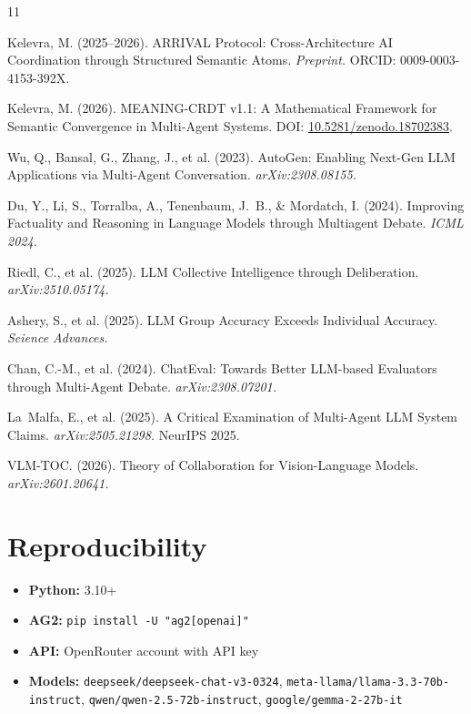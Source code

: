 \documentclass[11pt,a4paper]{article}
\begin{document}
\begin{thebibliography}{11}

Kelevra, M. (2025--2026).
\newblock ARRIVAL Protocol: Cross-Architecture AI Coordination through
  Structured Semantic Atoms.
\newblock \textit{Preprint.}
\newblock ORCID: 0009-0003-4153-392X.

Kelevra, M. (2026).
\newblock MEANING-CRDT v1.1: A Mathematical Framework for Semantic
  Convergence in Multi-Agent Systems.
\newblock DOI: \href{https://doi.org/10.5281/zenodo.18702383}%
  {10.5281/zenodo.18702383}.

Wu, Q., Bansal, G., Zhang, J., et al. (2023).
\newblock AutoGen: Enabling Next-Gen LLM Applications via Multi-Agent
  Conversation.
\newblock \textit{arXiv:2308.08155.}

Du, Y., Li, S., Torralba, A., Tenenbaum, J.~B., \& Mordatch, I. (2024).
\newblock Improving Factuality and Reasoning in Language Models through
  Multiagent Debate.
\newblock \textit{ICML 2024.}

Riedl, C., et al. (2025).
\newblock LLM Collective Intelligence through Deliberation.
\newblock \textit{arXiv:2510.05174.}

Ashery, S., et al. (2025).
\newblock LLM Group Accuracy Exceeds Individual Accuracy.
\newblock \textit{Science Advances.}

Chan, C.-M., et al. (2024).
\newblock ChatEval: Towards Better LLM-based Evaluators through
  Multi-Agent Debate.
\newblock \textit{arXiv:2308.07201.}

La~Malfa, E., et al. (2025).
\newblock A Critical Examination of Multi-Agent LLM System Claims.
\newblock \textit{arXiv:2505.21298.} NeurIPS 2025.

VLM-TOC. (2026).
\newblock Theory of Collaboration for Vision-Language Models.
\newblock \textit{arXiv:2601.20641.}

\end{thebibliography}

\appendix
\section{Reproducibility}

\begin{itemize}
  \item \textbf{Python:} 3.10+
  \item \textbf{AG2:} \texttt{pip install -U "ag2[openai]"}
  \item \textbf{API:} OpenRouter account with API key
  \item \textbf{Models:} \texttt{deepseek/deepseek-chat-v3-0324},
    \texttt{meta-llama/llama-3.3-70b-instruct},
    \texttt{qwen/qwen-2.5-72b-instruct},
    \texttt{google/gemma-2-27b-it}
\end{itemize}
\end{document}
